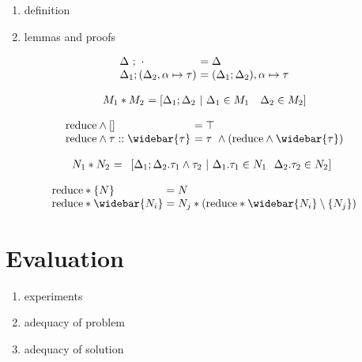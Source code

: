\documentclass[manuscript]{acmart}
\begin{document}
\begin{enumerate}
  \item definition 
  \item lemmas and proofs 
\end{enumerate}

\[
  \begin{array}{l @{} l}
  \Delta\ ;\ \cdot
  &\ = \Delta 
  \\
  \Delta_1;(\Delta_2,\alpha \mapsto \tau) 
  &\ = (\Delta_1;\Delta_2),\alpha \mapsto \tau
  \end{array}
\]


\[
  \begin{array}{l @{} l}
  M_1 * M_2 
  &\ = 
  [\Delta_1 ; \Delta_2 \ |\ 
    \Delta_1 \in M_1
    \ \ \  
    \Delta_2 \in M_2
  ]
  \end{array}
\]

\[
  \begin{array}{l @{} l}
  \text{reduce} \wedge [] 
  &\ = \top
  \\
  \text{reduce} \wedge \tau::\widebar{\tau}
  &\ = \tau\ \wedge (\text{reduce} \wedge \widebar{\tau})
  \end{array}
\]

\[
  \begin{array}{l @{} l}
    N_1 * N_2
    &\ = 
    \begin{array}[t]{l}
      [ \Delta_1 ; \Delta_2 . \tau_1 \wedge \tau_2 \ |\ 
        \Delta_1.\tau_1 \in N_1
        \ \ 
        \Delta_2.\tau_2 \in N_2
      ]
    \end{array}
  \end{array}
\]

\[
  \begin{array}{l @{}l}
  \text{reduce} * \{N\}
  & {}= N
  \\
  \text{reduce} * \widebar{N_i}
  & {}= N_j * (\text{reduce} * \widebar{N_i}\setminus\{N_j\})
  \end{array}
\]




\section{Evaluation}
\begin{enumerate}
  \item experiments 
  \item adequacy of problem 
  \item adequacy of solution 
\end{enumerate}
\end{document}
